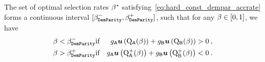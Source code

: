 	\begin{thm}\label{thm:dem_par_selection}
	
	The set of optimal selection rates $\beta^*$ satisfying~\eqref{eq:hard_const_dempar_accrate} forms a continuous interval $[\beta_{\mathtt{DemParity}}^-,\beta_{\mathtt{DemParity}}^+]$, such that for any $\beta \in [0,1]$, we have
	\begin{eqnarray*}
	\beta < \beta_{\mathtt{DemParity}}^- &\text{if}& g_{\mathsf{A}}\boldsymbol{u}\left(\mathrm{Q}_{\mathsf{A}}(\beta)\right) + g_{\mathsf{B}}\boldsymbol{u}\left(\mathrm{Q}_{\mathsf{B}}(\beta)\right) > 0\:, \\
	\beta > \beta_{\mathtt{DemParity}}^+ &\text{if}& g_{\mathsf{A}}\boldsymbol{u}\left(\mathrm{Q}^+_{\mathsf{A}}(\beta) \right)+ g_{\mathsf{B}}\boldsymbol{u}\left(\mathrm{Q}^+_{\mathsf{B}}(\beta)\right) < 0\:. \\
	\end{eqnarray*}
		\end{thm}
